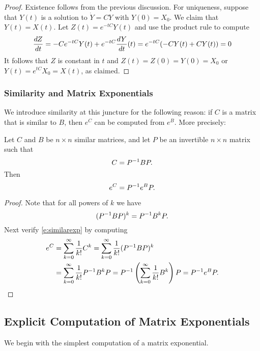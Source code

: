 \documentclass{ximera}
\begin{document}
\begin{proof}  Existence follows from the previous discussion.
For uniqueness, suppose that $Y(t)$ is a solution to $\dot{Y}=CY$
with $Y(0)=X_0$.  We claim that $Y(t)=X(t)$.  Let $Z(t) = e^{-tC}Y(t)$ 
and use the product rule to compute 
\[
\displaystyle\frac{dZ}{dt} = -C e^{-tC}Y(t) + e^{-tC}\frac{dY}{dt}(t) = e^{-tC}(-CY(t) + C Y(t)) = 0
\]  
It follows that $Z$ is constant in $t$ and $Z(t) = Z(0) = Y(0) = X_0$ or 
$Y(t) = e^{tC}X_0 = X(t)$, as claimed.
\end{proof}

\subsubsection*{Similarity and Matrix Exponentials}

We introduce similarity at this juncture for the following reason:
if $C$ is a matrix that is similar to $B$, then $e^C$ can be computed
from $e^B$.  More precisely:

\begin{lemma} \label{L:similarexp}
Let $C$ and $B$ be $n\times n$ similar matrices, and let $P$ be
an invertible $n\times n$ matrix such that
\[
C=P^{-1} BP.
\]
Then
\begin{equation}  \label{e:similarexp}
e^C = P^{-1} e^BP.
\end{equation}
\end{lemma}  

\begin{proof} Note that for all powers of $k$ we have
\[
(P^{-1} BP)^k = P^{-1} B^kP.
\]
Next verify \eqref{e:similarexp} by computing
\begin{align*}
e^C &=\sum^{\infty}_{k=0} \frac{1}{k!}C^k
 =  \sum^{\infty}_{k=0} \frac{1}{k!}(P^{-1} BP)^k \\
&=  \sum^{\infty}_{k=0} \frac{1}{k!}P^{-1} B^kP
= P^{-1}\left(\sum^{\infty}_{k=0} \frac{1}{k!}B^k\right)P
= P^{-1} e^B P.
\end{align*}
\end{proof}



\subsection*{Explicit Computation of Matrix Exponentials}

We begin with the simplest computation of a matrix exponential.
\end{document}
